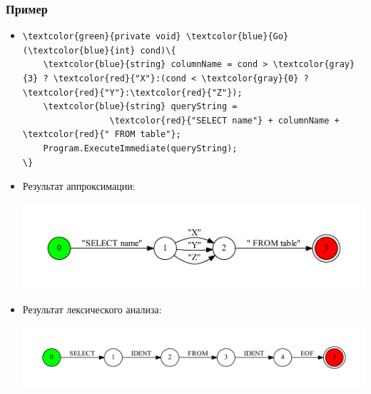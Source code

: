 \documentclass{beamer}
\begin{document}
\begin{frame}[fragile]
\transwipe[direction=90]
\frametitle{Пример}
\begin{itemize}
\item 
\begin{Verbatim}[commandchars=\\\{\}]
\textcolor{green}{private void} \textcolor{blue}{Go} (\textcolor{blue}{int} cond)\{
	\textcolor{blue}{string} columnName = cond > \textcolor{gray}{3} ? \textcolor{red}{"X"}:(cond < \textcolor{gray}{0} ? \textcolor{red}{"Y"}:\textcolor{red}{"Z"});
	\textcolor{blue}{string} queryString = 
	             \textcolor{red}{"SELECT name"} + columnName + \textcolor{red}{" FROM table"};
	Program.ExecuteImmediate(queryString);
\}
\end{Verbatim}
		
\item Результат аппроксимации:
\begin{center}
	{\includegraphics[width=1.0\linewidth]{tsql_test}}
\end{center}

\item Результат лексического анализа:
\begin{center}
    {\includegraphics[width=1.0\linewidth]{tsql_test_appr}}
\end{center}
\end{itemize}
\end{frame}
\end{document}

